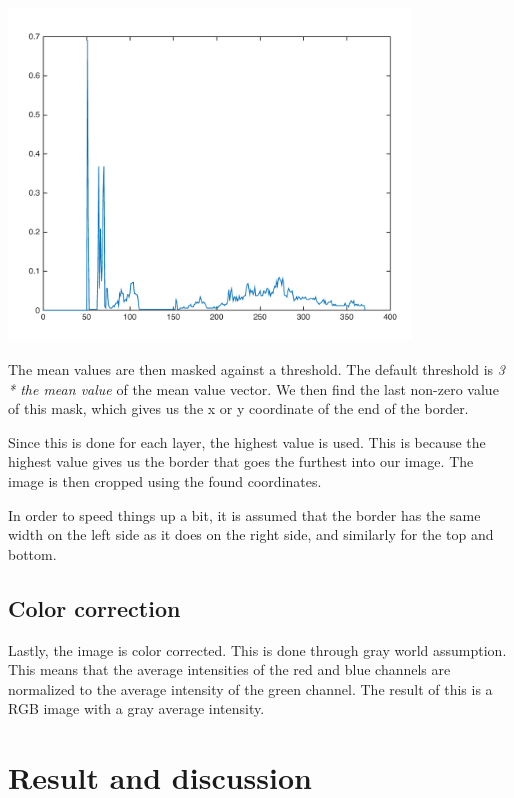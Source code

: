 \documentclass[12pt,a4paper]{article}
\newenvironment{Figure}
  {\par\medskip\noindent\minipage{\linewidth}}
  {\endminipage\par\medskip}
\begin{document}
    \begin{Figure}
      \centering
        \includegraphics[width=0.8\textwidth]{mean_plot.pdf}
        \label{fig:mean}
    \end{Figure}

    The mean values are then masked against a threshold. The default threshold is \emph{3 * the mean value} of the mean value vector. We then find the last non-zero value of this mask, which gives us the x or y coordinate of the end of the border.

    Since this is done for each layer, the highest value is used. This is because the highest value gives us the border that goes the furthest into our image. The image is then cropped using the found coordinates.

    In order to speed things up a bit, it is assumed that the border has the same width on the left side as it does on the right side, and similarly for the top and bottom.

  \subsection*{Color correction}

    Lastly, the image is color corrected. This is done through gray world assumption. This means that the average intensities of the red and blue channels are normalized to the average intensity of the green channel. The result of this is a RGB image with a gray average intensity.

\section*{Result and discussion}
\end{document}
